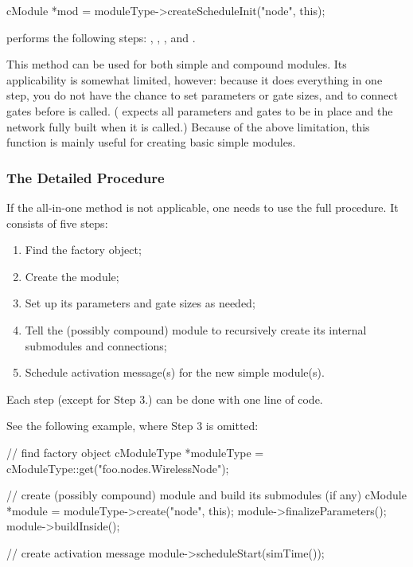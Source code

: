 \begin{cpp}
cModule *mod = moduleType->createScheduleInit("node", this);
\end{cpp}

 performs the following steps: ,
, ,
 and .

This method can be used for both simple and compound modules. Its
applicability is somewhat limited, however: because it does everything in
one step, you do not have the chance to set parameters or gate sizes, and
to connect gates before  is called.
( expects all parameters and gates to be in place and
the network fully built when it is called.) Because of the above
limitation, this function is mainly useful for creating basic simple
modules.


\subsubsection{The Detailed Procedure}
\label{sec:simple-modules:dynamic-creation:details}

If the  all-in-one method is not applicable,
one needs to use the full procedure. It consists of five steps:

\begin{enumerate}
  \item Find the factory object;
  \item Create the module;
  \item Set up its parameters and gate sizes as needed;
  \item Tell the (possibly compound) module to recursively create
        its internal submodules and connections;
  \item Schedule activation message(s) for the new simple module(s).
\end{enumerate}

Each step (except for Step 3.) can be done with one line of code.

See the following example, where Step 3 is omitted:

\begin{cpp}
// find factory object
cModuleType *moduleType = cModuleType::get("foo.nodes.WirelessNode");

// create (possibly compound) module and build its submodules (if any)
cModule *module = moduleType->create("node", this);
module->finalizeParameters();
module->buildInside();

// create activation message
module->scheduleStart(simTime());
\end{cpp}

